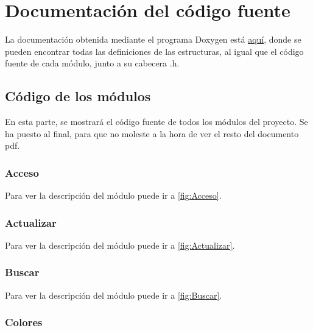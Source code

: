 

\section{Documentación del código fuente}

La documentación obtenida mediante el programa Doxygen está \href{DOC_DOXYGEN/index.html}{aquí}, donde se pueden encontrar
todas las definiciones de las estructuras, al igual que el código fuente de cada módulo, junto a su cabecera .h.

\subsection{Código de los módulos}

En esta parte, se mostrará el código fuente de todos los módulos del proyecto. Se ha puesto al final, para que no moleste a la hora de ver el resto del documento pdf.
\label{fig:CodigoModulos}

\subsubsection{Acceso}

Para ver la descripción del módulo puede ir a \ref{fig:Acceso}.

\label{fig:AccesoCod}


\subsubsection{Actualizar}

Para ver la descripción del módulo puede ir a \ref{fig:Actualizar}.

\label{fig:ActualizarCod}


\subsubsection{Buscar}

Para ver la descripción del módulo puede ir a \ref{fig:Buscar}.

\label{fig:BuscarCod}


\subsubsection{Colores}

